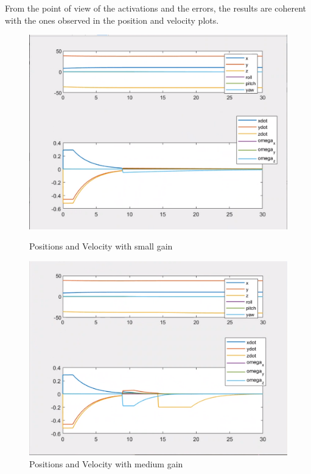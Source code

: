 \documentclass{article}
\begin{document}
From the point of view of the activations and the errors, the results are coherent with the ones observed in the position and velocity plots.
\begin{figure}[htpb] 
\begin{minipage}{0.40\textwidth}  
\includegraphics[width=\textwidth]{313_s_ppdot.png}
\caption{Positions and Velocity with small gain}\label{ppdot_w_s} 
\end{minipage}  
\hspace{0.2\textwidth} 
\begin{minipage}{0.40\textwidth}  
\includegraphics[width=\textwidth]{313_m_ppdot.png}
\caption{Positions and Velocity with medium gain}\label{ppdot_w_m} 

\end{minipage}
\end{figure}
\end{document}

